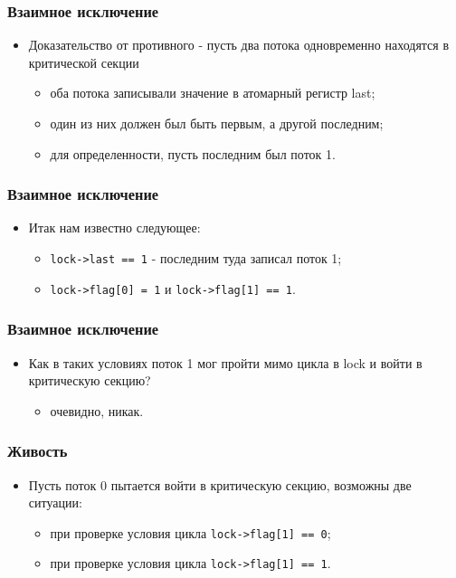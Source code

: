 \begin{frame}
\frametitle{Взаимное исключение}
\begin{itemize}
    \item<1->Доказательство от противного - пусть два потока одновременно
         находятся в критической секции
    \begin{itemize}
        \item<2->оба потока записывали значение в атомарный регистр last;
        \item<3->один из них должен был быть первым, а другой последним;
        \item<4->для определенности, пусть последним был поток 1.
    \end{itemize}
\end{itemize}
\end{frame}

\begin{frame}
\frametitle{Взаимное исключение}
\begin{itemize}
    \item<1->Итак нам известно следующее:
    \begin{itemize}
        \item<2->\lstinline|lock->last == 1| - последним туда записал поток 1;
        \item<3->\lstinline|lock->flag[0] = 1| и \lstinline|lock->flag[1] == 1|.
    \end{itemize}
\end{itemize}
\end{frame}

\begin{frame}
\frametitle{Взаимное исключение}
\begin{itemize}
    \item<1->Как в таких условиях поток 1 мог пройти мимо цикла в lock и войти
         в критическую секцию?
    \begin{itemize}
        \item<2->очевидно, никак.
    \end{itemize}
\end{itemize}
\end{frame}

\begin{frame}
\frametitle{Живость}
\begin{itemize}
     \item<1->Пусть поток 0 пытается войти в критическую секцию, возможны две
          ситуации:
     \begin{itemize}
         \item<2->при проверке условия цикла \lstinline|lock->flag[1] == 0|;
         \item<3->при проверке условия цикла \lstinline|lock->flag[1] == 1|.
     \end{itemize}
\end{itemize}
\end{frame}

